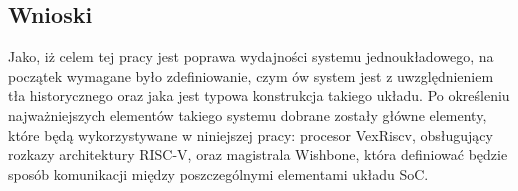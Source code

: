 \subsection{Wnioski}

Jako, iż celem tej pracy jest poprawa wydajności systemu jednoukładowego, na początek wymagane było zdefiniowanie, czym ów system jest z uwzględnieniem tła historycznego oraz jaka jest typowa konstrukcja takiego układu. Po określeniu najważniejszych elementów takiego systemu dobrane zostały główne elementy, które będą wykorzystywane w niniejszej pracy: procesor VexRiscv, obsługujący rozkazy architektury RISC-V, oraz magistrala Wishbone, która definiować będzie sposób komunikacji między poszczególnymi elementami układu SoC.
